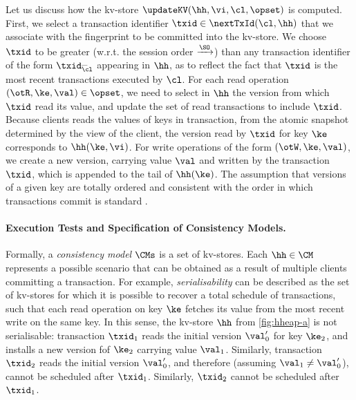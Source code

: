 Let us discuss how the kv-store $\updateKV(\hh, \vi, \cl, \opset)$ is computed. 
First, we select a transaction identifier $\txid \in \nextTxId(\cl, \hh)$ that we associate 
with the fingerprint to be committed into the kv-store. We choose $\txid$ to be 
greater (w.r.t. the session order $\xrightarrow{\SO}$) than any transaction identifier 
of the form $\txid_{\cl}^{\_}$ appearing in $\hh$, as to reflect the fact that 
$\txid$ is the most recent transactions executed by $\cl$.
For each read operation $(\otR, \ke, \val) \in \opset$, we need to select in $\hh$ the version 
from which $\txid$ read its value, and update the set of read transactions to include $\txid$. 
Because clients reads the values of keys in transaction, from the atomic 
snapshot determined by the view of the client, the version read by $\txid$ for key $\ke$ 
corresponds to $\hh(\ke, \vi)$. For write operations of the form $(\otW, \ke, \val)$, 
we create a new version, carrying value $\val$ and written by the transaction $\txid$, 
which is appended to the tail of $\hh(\ke)$. The assumption that versions of 
a given key are totally ordered and consistent with the order in which 
transactions commit is standard \cite{adya,framework-concur,seebelieve}. 

\paragraph{Execution Tests and Specification of Consistency Models.}
Formally, a \emph{consistency model} $\CMs$ is a 
set of kv-stores. Each $\hh \in \CM$ represents a possible scenario that 
can be obtained as a result of multiple clients committing a transaction. 
For example, \emph{serialisability} can be described as the set 
of kv-stores for which it is possible to recover a total schedule of transactions, 
such that each read operation on key $\ke$ fetches its value from the 
most recent write on the same key.
In this sense, the kv-store $\hh$ from \cref{fig:hheap-a} is not serialisable: 
transaction $\txid_1$ reads the initial version $\val'_0$ for key $\ke_{2}$, 
and installs a new version fof $\ke_{2}$ carrying value $\val_1$. Similarly, transaction $\txid_2$ 
reads the initial version $\val'_0$, and therefore (assuming $\val_1 \neq \val'_0$), 
cannot be scheduled after $\txid_1$. Similarly, $\txid_2$ cannot be scheduled after $\txid_1$.

